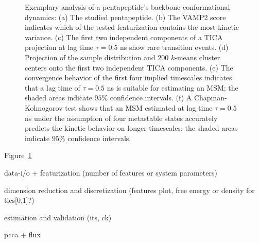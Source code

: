 \documentclass[9pt,tutorial]{livecoms}
\begin{document}
\begin{figure}
\caption{Exemplary analysis of a pentapeptide's backbone conformational dynamics: (a) The studied pentapeptide. (b) The VAMP2 score indicates which of the tested featurization contains the most kinetic variance. (c) The first two independent components of a TICA projection at lag time $\tau=0.5$ ns show rare transition events. (d) Projection of the sample distribution and 200 $k$-means cluster centers onto the first two independent TICA components. (e) The convergence behavior of the first four implied timescales indicates that a lag time of $\tau=0.5$ ns is suitable for estimating an MSM; the shaded areas indicate $95\%$ confidence intervals. (f) A Chapman-Kolmogorov test shows that an MSM estimated at lag time $\tau=0.5$ ns under the assumption of four metastable states accurately predicts the kinetic behavior on longer timescales; the shaded areas indicate $95\%$ confidence intervals.}
\label{fig:io-to-its}
\end{figure}

Figure~\ref{fig:io-to-its}




data-i/o + featurization (number of features or system parameters)

dimension reduction and discretization (features plot, free energy or density for tics[0,1]?)

estimation and validation (its, ck)

pcca + flux
\end{document}
